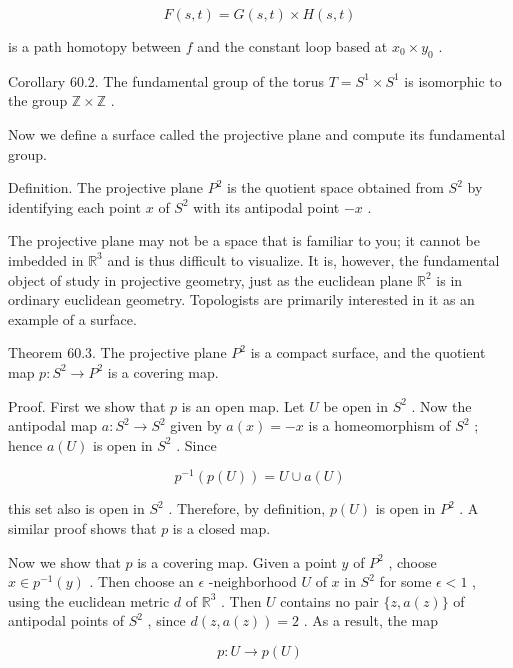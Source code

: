 \[
F\left( {s,t}\right)  = G\left( {s,t}\right)  \times  H\left( {s,t}\right)
\]

is a path homotopy between \(f\) and the constant loop based at \({x}_{0} \times  {y}_{0}\) .

Corollary 60.2. The fundamental group of the torus \(T = {S}^{1} \times  {S}^{1}\) is isomorphic to the group \(\mathbb{Z} \times  \mathbb{Z}\) .

Now we define a surface called the projective plane and compute its fundamental group.

Definition. The projective plane \({P}^{2}\) is the quotient space obtained from \({S}^{2}\) by identifying each point \(x\) of \({S}^{2}\) with its antipodal point \(- x\) .

The projective plane may not be a space that is familiar to you; it cannot be imbedded in \({\mathbb{R}}^{3}\) and is thus difficult to visualize. It is, however, the fundamental object of study in projective geometry, just as the euclidean plane \({\mathbb{R}}^{2}\) is in ordinary euclidean geometry. Topologists are primarily interested in it as an example of a surface.

Theorem 60.3. The projective plane \({P}^{2}\) is a compact surface, and the quotient map \(p : {S}^{2} \rightarrow  {P}^{2}\) is a covering map.

Proof. First we show that \(p\) is an open map. Let \(U\) be open in \({S}^{2}\) . Now the antipodal map \(a : {S}^{2} \rightarrow  {S}^{2}\) given by \(a\left( x\right)  =  - x\) is a homeomorphism of \({S}^{2}\) ; hence \(a\left( U\right)\) is open in \({S}^{2}\) . Since

\[
{p}^{-1}\left( {p\left( U\right) }\right)  = U \cup  a\left( U\right)
\]

this set also is open in \({S}^{2}\) . Therefore, by definition, \(p\left( U\right)\) is open in \({P}^{2}\) . A similar proof shows that \(p\) is a closed map.

Now we show that \(p\) is a covering map. Given a point \(y\) of \({P}^{2}\) , choose \(x \in  {p}^{-1}\left( y\right)\) . Then choose an \(\epsilon\) -neighborhood \(U\) of \(x\) in \({S}^{2}\) for some \(\epsilon  < 1\) , using the euclidean metric \(d\) of \({\mathbb{R}}^{3}\) . Then \(U\) contains no pair \(\{ z,a\left( z\right) \}\) of antipodal points of \({S}^{2}\) , since \(d\left( {z,a\left( z\right) }\right)  = 2\) . As a result, the map

\[
p : U \rightarrow  p\left( U\right)
\]

